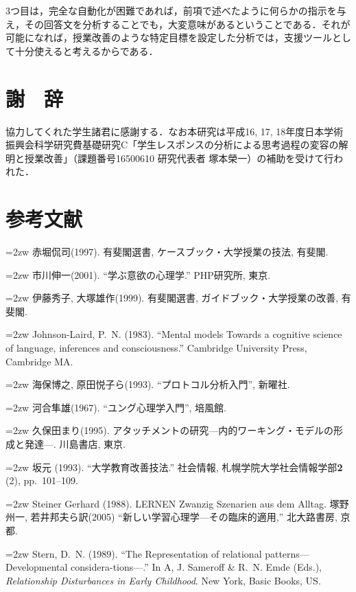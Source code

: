 \documentclass[japanese]{jnlp_1.3a}
\begin{document}
3つ目は，完全な自動化が困難であれば，前項で述べたように何らかの指示を与え，その回答文を分析することでも，大変意味があるということである．それが可能になれば，授業改善のような特定目標を設定した分析では，支援ツールとして十分使えると考えるからである．

\section*{謝　辞}

協力してくれた学生諸君に感謝する．なお本研究は平成16, 17, 18年度日本学術振興会科学研究費基礎研究C「学生レスポンスの分析による思考過程の変容の解明と授業改善」（課題番号16500610 
研究代表者 塚本榮一）の補助を受けて行われた．

\section*{参考文献}

\noindent{}\hangindent=2zw
赤堀侃司(1997). 有斐閣選書, ケースブック・大学授業の技法, 有斐閣. 

\noindent{}\hangindent=2zw
市川伸一(2001). ``学ぶ意欲の心理学.'' PHP研究所, 東京. 

\noindent{}\hangindent=2zw
伊藤秀子, 大塚雄作(1999). 有斐閣選書, ガイドブック・大学授業の改善, 有斐閣. 

\noindent{}\hangindent=2zw
Johnson-Laird, P.~N. (1983). ``Mental models Towards a cognitive science of 
language, inferences and consciousness.'' Cambridge University Press, 
Cambridge MA.

\noindent{}\hangindent=2zw
海保博之, 原田悦子ら(1993). ``プロトコル分析入門'', 新曜社. 

\noindent{}\hangindent=2zw
河合隼雄(1967). ``ユング心理学入門'', 培風館. 

\noindent{}\hangindent=2zw
久保田まり(1995). アタッチメントの研究—内的ワーキング・モデルの形成と発達—. 川島書店, 東京. 

\noindent{}\hangindent=2zw
坂元 (1993). ``大学教育改善技法.'' 社会情報, 札幌学院大学社会情報学部\textbf{2} (2), pp.~101--109.

\noindent{}\hangindent=2zw
Steiner Gerhard (1988). LERNEN Zwanzig Szenarien aus dem Alltag. 
塚野州一, 若井邦夫ら訳(2005) ``新しい学習心理学—その臨床的適用,'' 北大路書房, 京都. 

\noindent{}\hangindent=2zw
Stern, D.~N. (1989). ``The Representation of relational patterns---Developmental 
considera{-}tions---.'' In A, J. Sameroff {\&} R.~N. Emde (Eds.), \textit{Relationship Disturbances in Early Childhood}. New York,  Basic Books, US.
\end{document}
